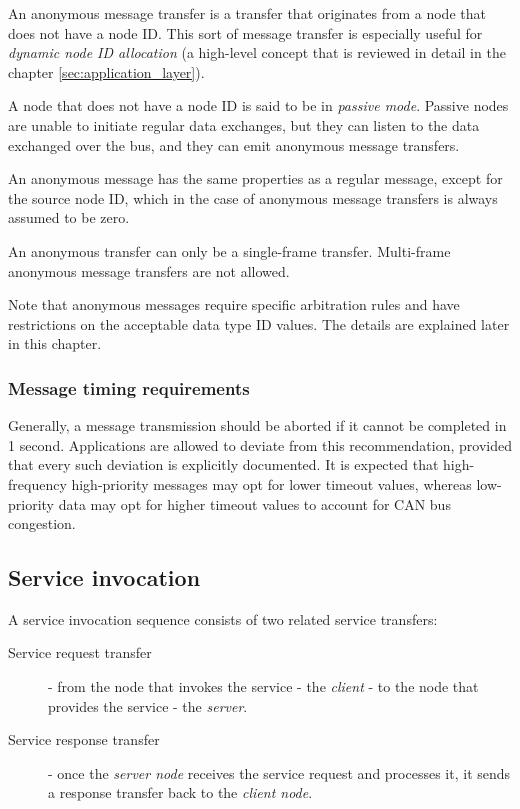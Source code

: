 An anonymous message transfer is a transfer that originates from a node that does not have a node ID.
This sort of message transfer is especially useful for \emph{dynamic node ID allocation}
(a high-level concept that is reviewed in detail in the chapter \ref{sec:application_layer}).

A node that does not have a node ID is said to be in \emph{passive mode}.
Passive nodes are unable to initiate regular data exchanges,
but they can listen to the data exchanged over the bus,
and they can emit anonymous message transfers.

An anonymous message has the same properties as a regular message, except for the source node ID,
which in the case of anonymous message transfers is always assumed to be zero.

An anonymous transfer can only be a single-frame transfer. Multi-frame anonymous message transfers are not allowed.

Note that anonymous messages require specific arbitration rules and have restrictions on the acceptable
data type ID values. The details are explained later in this chapter.

\subsubsection{Message timing requirements}

Generally, a message transmission should be aborted if it cannot be completed in 1 second.
Applications are allowed to deviate from this recommendation,
provided that every such deviation is explicitly documented.
It is expected that high-frequency high-priority messages may opt for lower timeout values,
whereas low-priority data may opt for higher timeout values to account for CAN bus congestion.

\subsection{Service invocation}

A service invocation sequence consists of two related service transfers:

\begin{description}
    \item[Service request transfer] - from the node that invokes the service - the \emph{client} - to the node that
    provides the service - the \emph{server}.

    \item[Service response transfer] - once the \emph{server node} receives the service request and processes it,
    it sends a response transfer back to the \emph{client node}.
\end{description}

